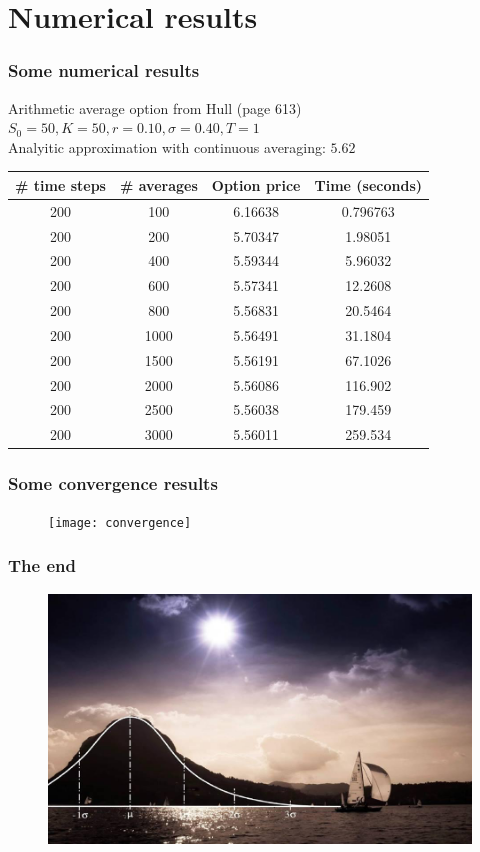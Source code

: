 \documentclass{beamer}
\begin{document}
\section{Numerical results}

\begin{frame}
\frametitle{Some numerical results}
\begin{center}
Arithmetic average option from Hull (page 613)\\
$S_0=50, K = 50, r = 0.10, \sigma = 0.40, T = 1$ \\
Analyitic approximation with continuous averaging: $5.62$
\end{center}

\begin{table}
\begin{tabular}{c c c c}
\toprule
\textbf{\# time steps} & \textbf{\# averages} & \textbf{Option price} & \textbf{Time (seconds)}\\
\midrule
200	&	100	&	6.16638	&	0.796763	\\
200	&	200	&	5.70347	&	1.98051	\\
200	&	400	&	5.59344	&	5.96032	\\
200	&	600	&	5.57341	&	12.2608	\\
200	&	800	&	5.56831	&	20.5464	\\
200	&	1000	&	5.56491	&	31.1804	\\
200	&	1500	&	5.56191	&	67.1026	\\
200	&	2000	&	5.56086	&	116.902	\\
200	&	2500	&	5.56038	&	179.459	\\
200	&	3000	&	5.56011	&	259.534	\\
\bottomrule
\end{tabular}
\end{table}
\end{frame}


\begin{frame}
\vspace*{-1cm}
\frametitle{Some convergence results}
\begin{figure}[t]
	\texttt{[image: convergence]}
\end{figure}
\end{frame}


\begin{frame}
\frametitle{The end}
\begin{figure}
	\includegraphics[scale=0.35]{end}
\end{figure}
\end{frame}

\end{document}
